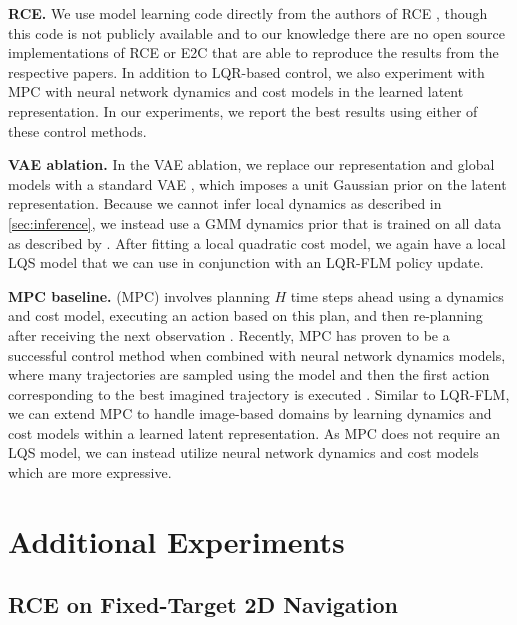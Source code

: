 {\bf RCE.} We use model learning code directly from the authors of RCE \citep{rce}, though this code is not publicly available and to our knowledge there are no open source implementations of RCE or E2C \citep{e2c} that are able to reproduce the results from the respective papers. In addition to LQR-based control, we also experiment with MPC with neural network dynamics and cost models in the learned latent representation. In our experiments, we report the best results using either of these control methods.

{\bf VAE ablation.} In the VAE ablation, we replace our representation and global models with a standard VAE \citep{vae-kingma,vae-rezende}, which imposes a unit Gaussian prior on the latent representation. Because we cannot infer local dynamics as described in \autoref{sec:inference}, we instead use a GMM dynamics prior that is trained on all data as described by \citet{gps}. After fitting a local quadratic cost model, we again have a local LQS model that we can use in conjunction with an LQR-FLM policy update.

{\bf MPC baseline.} (MPC) involves planning $H$ time steps ahead using a dynamics and cost model, executing an action based on this plan, and then re-planning after receiving the next observation \citep{mpc}. Recently, MPC has proven to be a successful control method when combined with neural network dynamics models, where many trajectories are sampled using the model and then the first action corresponding to the best imagined trajectory is executed \citep{nn-dyn,pets}. Similar to LQR-FLM, we can extend MPC to handle image-based domains by learning dynamics and cost models within a learned latent representation. As MPC does not require an LQS model, we can instead utilize neural network dynamics and cost models which are more expressive.


\section{Additional Experiments}
\label{sec:supp-exp}

\subsection{RCE on Fixed-Target 2D Navigation}

